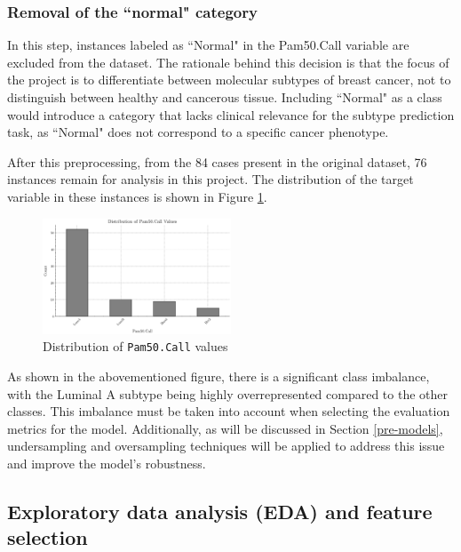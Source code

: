 \documentclass[conference]{IEEEtran}
\begin{document}
\subsubsection{Removal of the ``normal" category}

In this step, instances labeled as ``Normal" in the Pam50.Call variable are excluded from the dataset. The rationale behind this decision is that the focus of the project is to differentiate between molecular subtypes of breast cancer, not to distinguish between healthy and cancerous tissue. Including ``Normal" as a class would introduce a category that lacks clinical relevance for the subtype prediction task, as ``Normal" does not correspond to a specific cancer phenotype.

\vspace{5mm}

After this preprocessing, from the 84 cases present in the original dataset, 76 instances remain for analysis in this project. The distribution of the target variable in these instances is shown in Figure \ref{fig:pam_distr}.

\begin{figure}[H]
    \centering
    \includegraphics[width=0.5\textwidth]{images/pam_distr.png}
    \caption{Distribution of \texttt{Pam50.Call} values}
    \label{fig:pam_distr}
\end{figure}

As shown in the abovementioned figure, there is a significant class imbalance, with the Luminal A subtype being highly overrepresented compared to the other classes. This imbalance must be taken into account when selecting the evaluation metrics for the model. Additionally, as will be discussed in Section \ref{pre-models}, undersampling and oversampling techniques will be applied to address this issue and improve the model’s robustness.

\subsection{Exploratory data analysis (EDA) and feature selection}
\end{document}
